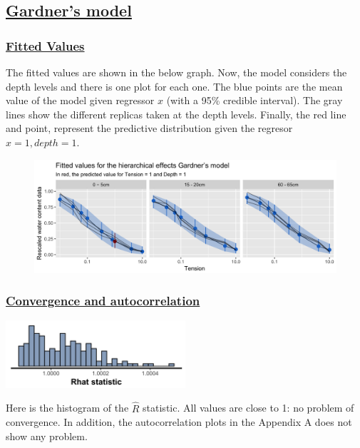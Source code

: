 \documentclass{article}
\begin{document}
\subsection*{\underline{Gardner's model}}
\subsubsection*{\underline{Fitted Values}}

The fitted values are shown in the below graph. Now, the model considers the depth levels and there is one plot for each one. The blue points are the mean value of the model given regressor $x$ (with a 95\% credible interval). The gray lines show the different replicas taken at the depth levels. Finally, the red line and point, represent the predictive distribution given the regresor $x = 1, depth = 1$.
\begin{figure}[ht!]
\centering
\includegraphics[width=14cm]{hier_2pars_pred.png}
\end{figure}

\subsubsection*{\underline{Convergence and autocorrelation}}
\begin{minipage}{0.50\textwidth}
\includegraphics[width=\linewidth, height = 2.5cm]{hier_2pars_rhat.png}
\end{minipage}
\begin{minipage}{0.50\textwidth}
Here is the histogram of the $\widehat{R}$ statistic. All values are close to 1: no problem of convergence. In addition, the autocorrelation plots in the Appendix A does not show any problem.
\end{minipage}
\end{document}
